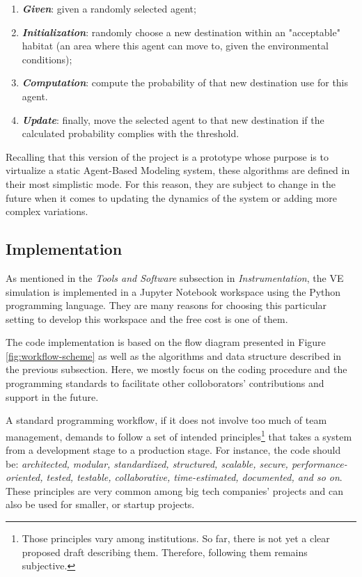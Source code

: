\begin{enumerate}
    \item \textbf{\textit{Given}}: given a randomly selected agent;
    \item \textbf{\textit{Initialization}}: randomly choose a new destination within an "acceptable" habitat (an area where this agent can move to, given the environmental conditions);
    \item \textbf{\textit{Computation}}: compute the probability of that new destination use for this agent.
    \item \textbf{\textit{Update}}: finally, move the selected agent to that new destination if the calculated probability complies with the threshold.
\end{enumerate}

Recalling that this version of the project is a prototype whose purpose is to virtualize a static Agent-Based Modeling system, these algorithms are defined in their most simplistic mode. For this reason, they are subject to change in the future when it comes to updating the dynamics of the system or adding more complex variations.

\subsection{Implementation}
As mentioned in the \emph{Tools and Software} subsection in \emph{Instrumentation}, the VE simulation is implemented in a Jupyter Notebook workspace using the Python programming language. They are many reasons for choosing this particular setting to develop this workspace and the free cost is one of them.

The code implementation is based on the flow diagram presented in Figure \ref{fig:workflow-scheme} as well as the algorithms and data structure described in the previous subsection. Here, we mostly focus on the coding procedure and the programming standards to facilitate other colloborators' contributions and support in the future.

A standard programming workflow, if it does not involve too much of team management, demands to follow a set of intended principles\footnote{Those principles vary among institutions. So far, there is not yet a clear proposed draft describing them. Therefore, following them remains subjective.} that takes a system from a development stage to a production stage. For instance, the code should be: \textit{architected, modular, standardized, structured, scalable, secure, performance-oriented, tested, testable, collaborative, time-estimated, documented, and so on}. These principles are very common among big tech companies' projects and can also be used for smaller, or startup projects.

